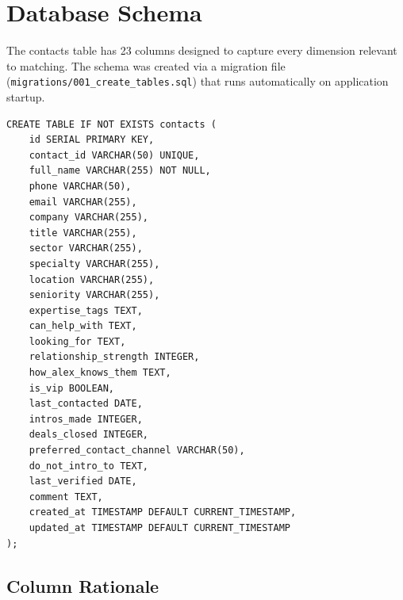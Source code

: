 \documentclass[12pt, a4paper]{report}
\begin{document}
\section{Database Schema}

The contacts table has 23 columns designed to capture every dimension relevant to matching. The schema was created via a migration file (\texttt{migrations/001\_create\_tables.sql}) that runs automatically on application startup.

\begin{lstlisting}[style=sqlstyle, caption={Full contacts table schema}]
CREATE TABLE IF NOT EXISTS contacts (
    id SERIAL PRIMARY KEY,
    contact_id VARCHAR(50) UNIQUE,
    full_name VARCHAR(255) NOT NULL,
    phone VARCHAR(50),
    email VARCHAR(255),
    company VARCHAR(255),
    title VARCHAR(255),
    sector VARCHAR(255),
    specialty VARCHAR(255),
    location VARCHAR(255),
    seniority VARCHAR(255),
    expertise_tags TEXT,
    can_help_with TEXT,
    looking_for TEXT,
    relationship_strength INTEGER,
    how_alex_knows_them TEXT,
    is_vip BOOLEAN,
    last_contacted DATE,
    intros_made INTEGER,
    deals_closed INTEGER,
    preferred_contact_channel VARCHAR(50),
    do_not_intro_to TEXT,
    last_verified DATE,
    comment TEXT,
    created_at TIMESTAMP DEFAULT CURRENT_TIMESTAMP,
    updated_at TIMESTAMP DEFAULT CURRENT_TIMESTAMP
);
\end{lstlisting}

\subsection{Column Rationale}
\end{document}
